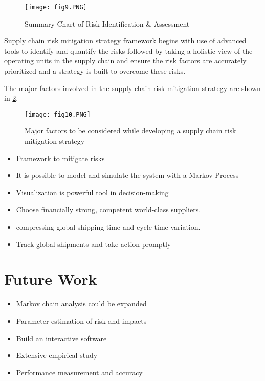 \documentclass[conference]{IEEEtran}
\begin{document}
\begin{figure}[thpb]
	\centering
	\texttt{[image: fig9.PNG]}
	\caption{Summary Chart of Risk Identification \& Assessment}
	\label{SummaryChart}
\end{figure}
Supply chain risk mitigation strategy framework begins with use of advanced tools to identify and quantify the risks followed by taking a holistic view of the operating units in the supply chain and ensure the risk factors are accurately prioritized and a strategy is built to overcome these risks.

The major factors involved in the supply chain risk mitigation strategy are shown in \ref{MitigatingFactors}.

\begin{figure}[thpb]
	\centering
	\texttt{[image: fig10.PNG]}
	\caption{Major factors to be considered while developing a supply chain risk mitigation strategy}
	\label{MitigatingFactors}
\end{figure}

\begin{itemize}
\item Framework to mitigate risks
\item It is possible to model and simulate the system with a Markov Process
\item  Visualization is powerful tool in decision-making
\item  Choose financially strong, competent world-class suppliers.
\item  compressing global shipping time and cycle time variation.
\item Track global shipments and take action promptly
\end{itemize}

\section{Future Work}
\begin{itemize}
\item Markov chain analysis could be expanded
\item Parameter estimation of risk and impacts
\item Build an interactive software
\item Extensive empirical study
\item Performance measurement and accuracy
\end{itemize}

\addtolength{\textheight}{-12cm}   %
\end{document}
